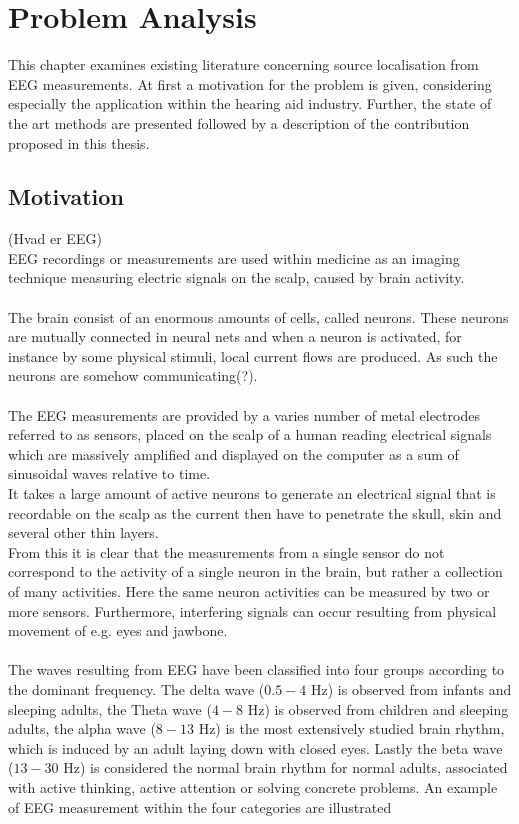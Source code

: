 \chapter{Problem Analysis}
This chapter examines existing literature concerning source localisation from EEG measurements. At first a motivation for the problem is given, considering especially the application within the hearing aid industry. Further, the state of the art methods are presented followed by a description of the contribution proposed in this thesis. 

\section{Motivation}
(Hvad er EEG)\\
EEG recordings or measurements are used within medicine as an imaging technique measuring electric signals on the scalp, caused by brain activity. \\
\\
The brain consist of an enormous amounts of cells, called neurons. These neurons are mutually connected in neural nets and when a neuron is activated, for instance by some physical stimuli, local current flows are produced\cite{fundamentalEEG}. As such the neurons are somehow communicating(?). \\
\\
The EEG measurements are provided by a varies number of metal electrodes referred to as sensors, placed on the scalp of a human reading electrical signals which are massively amplified and displayed on the computer as a sum of sinusoidal waves relative to time.\\
It takes a large amount of active neurons to generate an electrical signal that is recordable on the scalp as the current then have to penetrate the skull, skin and several other thin layers.  \\
From this it is clear that the measurements from a single sensor do not correspond to the activity of a single neuron in the brain, but rather a collection of many activities. Here the same neuron activities can be measured by two or more sensors. Furthermore, interfering signals can occur resulting from physical movement of e.g. eyes and jawbone\cite{fundamentalEEG}.\\
\\
The waves resulting from EEG have been classified into four groups according to the dominant frequency. The delta wave ($0.5-4$ Hz) is observed from infants and sleeping adults, the Theta wave ($4-8$ Hz) is observed from children and sleeping adults, the alpha wave ($8-13$ Hz) is the most extensively studied brain rhythm, which is induced by an adult laying down with closed eyes. Lastly the beta wave ($13-30$ Hz) is considered the normal brain rhythm for normal adults, associated with active thinking, active attention or solving concrete problems\cite[p. 11]{EEGsignalprocessing}. An example of EEG measurement within the four categories are illustrated 
